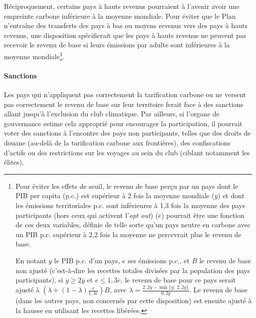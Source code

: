 \documentclass[a5paper,french,openany]{memoir}
\begin{document}
Réciproquement, certains pays à hauts revenus pourraient à l'avenir avoir une empreinte carbone inférieure à la moyenne mondiale. %
Pour éviter que le Plan n'entraîne des transferts des pays à bas ou moyens revenus vers des pays à hauts revenus, une disposition spécifierait que les pays à hauts revenus ne peuvent pas recevoir le revenu de base si leurs émissions par adulte sont inférieures à la moyenne mondiale\footnote{Pour éviter les effets de seuil, le revenu de base perçu par un pays dont le PIB per capita (p.c.) est supérieur à 2 fois la moyenne mondiale ($\overline{y}$) et dont les émissions territoriales p.c. sont inférieures à 1,3 fois la moyenne des pays participants (hors ceux qui activent l'\textit{opt out}) ($\overline{e}$) pourrait être une fonction de ces deux variables, définie de telle sorte qu'un pays neutre en carbone avec un PIB p.c. supérieur à 2,2 fois la moyenne ne percevrait plus le revenu de base. 

En notant $y$ le PIB p.c. d'un pays, $e$ ses émissions p.c., et $B$ le revenu de base non ajusté (c'est-à-dire les recettes totales divisées par la population des pays participants), si $y\geq 2\overline{y}$ et $e \leq 1,3 \overline{e}$, le revenu de base pour ce pays serait ajusté à $\left(\lambda + \left(1-\lambda \right) \frac{e}{1,3\overline{e}} \right) B$, avec $\lambda = \frac{2,2\overline{y}-\min\{y;\;2,2\overline{y}\}}{0,2\overline{y}}$. 
Le revenu de base (dans les autres pays, non concernés par cette disposition) est ensuite ajusté à la hausse en utilisant les recettes libérées.}. 

\paragraph{Sanctions}

Les pays qui n'appliquent pas correctement la tarification carbone ou ne versent pas correctement le revenu de base sur leur territoire ferait face à des sanctions allant jusqu'à l'exclusion du club climatique. 
Par ailleurs, si l'organe de gouvernance estime cela approprié pour encourager la participation, il pourrait voter des sanctions à l'encontre des pays non participants, telles que des droits de douane (au-delà de la tarification carbone aux frontières), des confiscations d'actifs ou des restrictions sur les voyages au sein du club (ciblant notamment les élites). 
\end{document}
